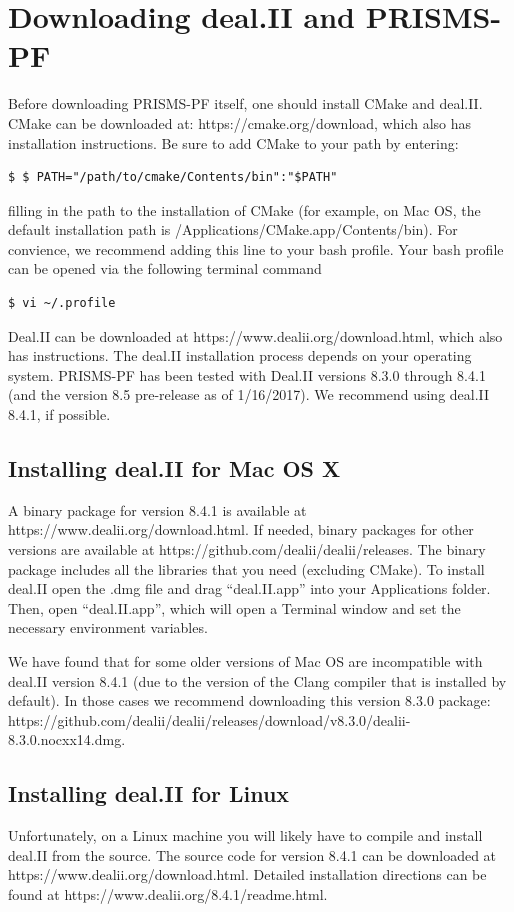 \documentclass[10pt]{article} %
\begin{document}
\section{Downloading deal.II and PRISMS-PF}

Before downloading PRISMS-PF itself, one should install CMake and deal.II. CMake can be downloaded at: https://cmake.org/download, which also has installation instructions. Be sure to add CMake to your path by entering:
\begin{lstlisting}
$ $ PATH="/path/to/cmake/Contents/bin":"$PATH"
\end{lstlisting}
filling in the path to the installation of CMake (for example, on Mac OS, the default installation path is /Applications/CMake.app/Contents/bin). For convience, we recommend adding this line to your bash profile. Your bash profile can be opened via the following terminal command
\begin{lstlisting}
$ vi ~/.profile
\end{lstlisting}

Deal.II can be downloaded at https://www.dealii.org/download.html, which also has instructions. The deal.II installation process depends on your operating system. PRISMS-PF has been tested with Deal.II versions 8.3.0 through 8.4.1 (and the version 8.5 pre-release as of 1/16/2017). We recommend using deal.II 8.4.1, if possible.

\subsection{Installing deal.II for Mac OS X}
A binary package for version 8.4.1 is available at https://www.dealii.org/download.html. If needed, binary packages for other versions are available at https://github.com/dealii/dealii/releases. The binary package includes all the libraries that you need (excluding CMake). To install deal.II open the .dmg file and drag ``deal.II.app'' into your Applications folder. Then, open ``deal.II.app'', which will open a Terminal window and set the necessary environment variables. 

We have found that for some older versions of Mac OS are incompatible with deal.II version 8.4.1 (due to the version of the Clang compiler that is installed by default). In those cases we recommend downloading this version 8.3.0 package:
\\ https://github.com/dealii/dealii/releases/download/v8.3.0/dealii-8.3.0.nocxx14.dmg.

\subsection{Installing deal.II for Linux}
Unfortunately, on a Linux machine you will likely have to compile and install deal.II from the source. The source code for version 8.4.1 can be downloaded at https://www.dealii.org/download.html. Detailed installation directions can be found at https://www.dealii.org/8.4.1/readme.html.
\end{document}
